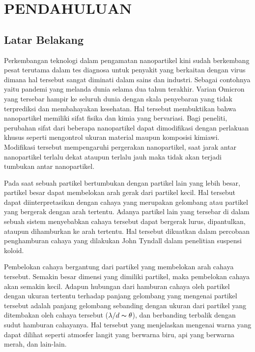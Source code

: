 \chapter{PENDAHULUAN}

\section{Latar Belakang}
Perkembangan teknologi dalam pengamatan nanopartikel kini sudah berkembang pesat terutama dalam tes
diagnosa untuk penyakit yang berkaitan dengan virus dimana hal tersebut sangat diminati dalam sains
dan industri. Sebagai contohnya yaitu pandemi yang melanda dunia selama dua tahun terakhir.
Varian Omicron yang tersebar hampir ke seluruh dunia dengan skala penyebaran yang tidak terprediksi
dan membahayakan kesehatan. Hal tersebut membuktikan bahwa nanopartikel memiliki sifat fisika dan
kimia yang bervariasi. Bagi peneliti, perubahan sifat dari beberapa nanopartikel dapat dimodifikasi
dengan perlakuan khusus seperti mengontrol ukuran material maupun komposisi kimiawi\cite{Silva2022}.
Modifikasi tersebut mempengaruhi pergerakan nanopartikel, saat jarak antar nanopartikel terlalu dekat
ataupun terlalu jauh maka tidak akan terjadi tumbukan antar nanopartikel.

Pada saat sebuah partikel bertumbukan dengan partikel lain yang lebih besar, partikel besar dapat
membelokan arah gerak dari partikel kecil. Hal tersebut dapat diinterpretasikan dengan cahaya yang
merupakan gelombang atau partikel yang bergerak dengan arah tertentu. Adanya partikel lain yang
tersebar di dalam sebuah sistem menyebabkan cahaya tersebut dapat bergerak lurus, dipantulkan,
ataupun dihamburkan ke arah tertentu. Hal tersebut dikuatkan dalam percobaan penghamburan cahaya
yang dilakukan John Tyndall dalam penelitian suspensi koloid\cite{Goldburg1999,Falke2019}. 

Pembelokan cahaya bergantung dari partikel yang membelokan arah cahaya tersebut. Semakin besar
dimensi yang dimiliki partikel, maka pembelokan cahaya akan semakin kecil. Adapun hubungan dari
hamburan cahaya oleh partikel dengan ukuran tertentu terhadap panjang gelombang yang mengenai
partikel tersebut adalah panjang gelombang sebanding dengan ukuran dari partikel yang ditembakan
oleh cahaya tersebut (${\lambda/d \thicksim \theta}$), dan berbanding terbalik dengan sudut hamburan
cahayanya. Hal tersebut yang menjelaskan mengenai warna yang dapat dilihat seperti atmosfer langit
yang berwarna biru, api yang berwarna merah, dan lain-lain. 

